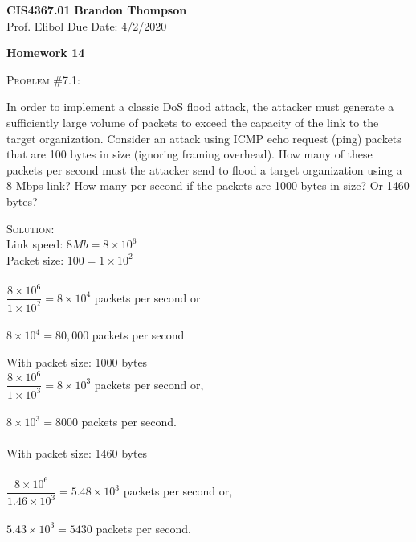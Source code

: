 \documentclass[12pt]{article}
\newenvironment{problem}[1]
{\begin{mdframed}[linewidth=0.8pt]
        \textsc{Problem #1:}

}
    {\end{mdframed}}
\newenvironment{solution}
    {\textsc{Solution:}\\}
    {\newpage}%
\begin{document}
\noindent
\textbf{CIS4367.01} \hfill \textbf{Brandon Thompson} \\
\normalsize Prof. Elibol \hfill Due Date: 4/2/2020 \\

\begin{center}
\textbf{Homework 14}
\end{center}
	\begin{problem}{\#7.1}
		In order to implement a classic DoS flood attack, the attacker must generate a sufficiently large volume of packets to exceed the capacity of the link to the target organization. Consider an attack using ICMP echo request (ping) packets that are 100 bytes in size (ignoring framing overhead). How many of these packets per second must the attacker send to flood a target organization using a 8-Mbps link? How many per second if the packets are 1000 bytes in size? Or 1460 bytes?
	\end{problem}
	\begin{solution}
		Link speed: $8Mb = 8\times 10^{6}$\\
		Packet size: $100 = 1\times 10^{2}$ \\
		\\
		$\dfrac{8\times 10^6}{1\times 10^2} = 8\times 10^4$ packets per second or \\
		\\
		$8\times 10^4 = 80,000$ packets per second

		With packet size: 1000 bytes\\
		$\dfrac{8\times 10^6}{1\times 10^3} = 8\times 10^3$ packets per second or,\\
		\\
		$8\times 10^3 = 8000$ packets per second.\\
		\\
		With packet size: 1460 bytes\\
		\\
		$\dfrac{8\times 10^6}{1.46 \times 10^3} = 5.48 \times 10^3$ packets per second or,\\
		\\
		$5.43\times 10^3 = 5430$ packets per second.
	\end{solution}
\end{document}
